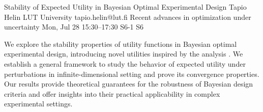 \begin{talk}
  {Stability of Expected Utility in Bayesian Optimal Experimental Design}%
  {Tapio Helin}%
  {LUT University}%
  {tapio.helin@lut.fi}%
  {Recent advances in optimization under uncertainty}%
  {}%
  {Mon, Jul 28 15:30–17:30}%
  {S6-1}%
  {S6}%
				
			
We explore the stability properties of utility functions in Bayesian optimal experimental design, introducing novel utilities inspired by the analysis . We establish a general framework to study the behavior of expected utility under perturbations in infinite-dimensional setting and prove its convergence properties. Our results provide theoretical guarantees for the robustness of Bayesian design criteria and offer insights into their practical applicability in complex experimental settings.

\medskip

%
\end{talk}

